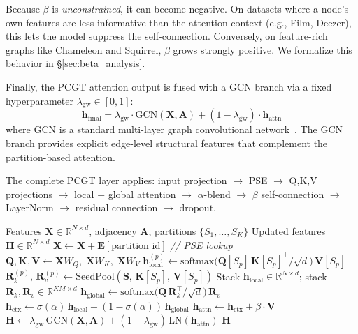 \documentclass[manuscript, screen, review, anonymous]{acmart}
\begin{document}
Because $\beta$ is \emph{unconstrained}, it can become negative. On datasets where a node's own features are less informative than the attention context (e.g., Film, Deezer), this lets the model suppress the self-connection. Conversely, on feature-rich graphs like Chameleon and Squirrel, $\beta$ grows strongly positive. We formalize this behavior in \S\ref{sec:beta_analysis}.

Finally, the PCGT attention output is fused with a GCN branch via a fixed hyperparameter $\lambda_{\text{gw}} \in [0,1]$:
\begin{equation}
\mathbf{h}_{\text{final}} = \lambda_{\text{gw}} \cdot \text{GCN}(\mathbf{X}, \mathbf{A}) + (1 - \lambda_{\text{gw}}) \cdot \mathbf{h}_{\text{attn}}
\end{equation}
where GCN is a standard multi-layer graph convolutional network~\cite{kipf2017semi}. The GCN branch provides explicit edge-level structural features that complement the partition-based attention.

The complete PCGT layer applies: input projection $\to$ PSE $\to$ Q,K,V projections $\to$ local + global attention $\to$ $\alpha$-blend $\to$ $\beta$ self-connection $\to$ LayerNorm $\to$ residual connection $\to$ dropout.

\begin{algorithm}[t]
\caption{PCGT Forward Pass (one layer)}
\label{alg:pcgt}
\begin{algorithmic}[1]
\REQUIRE Features $\mathbf{X} \in \mathbb{R}^{N \times d}$, adjacency $\mathbf{A}$, partitions $\{S_1, \ldots, S_K\}$
\ENSURE Updated features $\mathbf{H} \in \mathbb{R}^{N \times d}$
\STATE $\mathbf{X} \leftarrow \mathbf{X} + \mathbf{E}[\text{partition id}]$ \hfill \textit{// PSE lookup}
\STATE $\mathbf{Q}, \mathbf{K}, \mathbf{V} \leftarrow \mathbf{X} W_Q,\; \mathbf{X} W_K,\; \mathbf{X} W_V$
  \STATE $\mathbf{h}^{(p)}_{\mathrm{local}} \leftarrow \mathrm{softmax}\!\bigl(\mathbf{Q}[S_p]\, \mathbf{K}[S_p]^{\!\top}\!/\sqrt{d}\bigr)\, \mathbf{V}[S_p]$
  \STATE $\mathbf{R}_k^{(p)},\, \mathbf{R}_v^{(p)} \leftarrow \mathrm{SeedPool}(\mathbf{S},\, \mathbf{K}[S_p],\, \mathbf{V}[S_p])$
\ENDFOR
\STATE Stack $\mathbf{h}_{\mathrm{local}} \!\in\! \mathbb{R}^{N \times d}$;\; stack $\mathbf{R}_k, \mathbf{R}_v \!\in\! \mathbb{R}^{KM \times d}$
\STATE $\mathbf{h}_{\mathrm{global}} \leftarrow \mathrm{softmax}\!\bigl(\mathbf{Q}\, \mathbf{R}_k^{\!\top}\!/\sqrt{d}\bigr)\, \mathbf{R}_v$
\STATE $\mathbf{h}_{\mathrm{ctx}} \leftarrow \sigma(\alpha)\, \mathbf{h}_{\mathrm{local}} + (1\!-\!\sigma(\alpha))\, \mathbf{h}_{\mathrm{global}}$
\STATE $\mathbf{h}_{\mathrm{attn}} \leftarrow \mathbf{h}_{\mathrm{ctx}} + \beta \cdot \mathbf{V}$
\STATE $\mathbf{H} \leftarrow \lambda_{\mathrm{gw}}\, \mathrm{GCN}(\mathbf{X}, \mathbf{A}) + (1\!-\!\lambda_{\mathrm{gw}})\, \mathrm{LN}(\mathbf{h}_{\mathrm{attn}})$
\RETURN $\mathbf{H}$
\end{algorithmic}
\end{algorithm}
\end{document}
